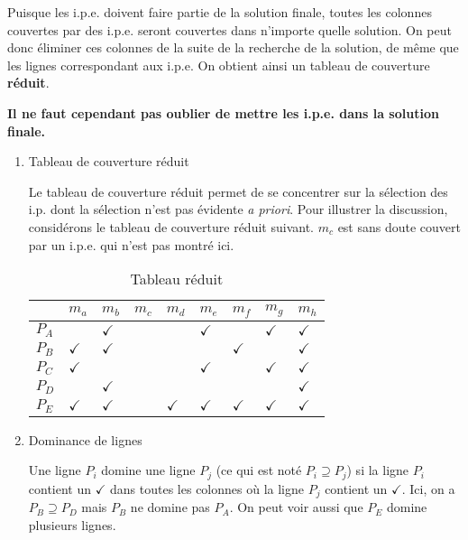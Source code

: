 \documentclass[letter, oneside]{book}
\begin{document}
Puisque les i.p.e. doivent faire partie de la solution finale, toutes
les colonnes couvertes par des i.p.e. seront couvertes dans n'importe
quelle solution. On peut donc éliminer ces colonnes de la suite de la
recherche de la solution, de même que les lignes correspondant aux
i.p.e. On obtient ainsi un tableau de couverture \textbf{réduit}.

\textbf{Il ne faut cependant pas oublier de mettre les i.p.e. dans la solution
finale.}

\begin{enumerate}
\item Tableau de couverture réduit
\label{sec:org0855a0f}

Le tableau de couverture réduit permet de se concentrer sur la
sélection des i.p. dont la sélection n'est pas évidente \emph{a
priori}. Pour illustrer la discussion, considérons le tableau de
couverture réduit suivant. \(m_c\) est sans doute couvert par un
i.p.e. qui n'est pas montré ici.

\begin{table}[htbp]
\caption{\label{tab:orgab6062e}Tableau réduit}
\centering
\begin{tabular}{lllllllll}
 & \(m_a\) & \(m_b\) & \(m_c\) & \(m_d\) & \(m_e\) & \(m_f\) & \(m_g\) & \(m_h\)\\[0pt]
\hline
\(P_A\) &  & \(\checkmark\) &  &  & \(\checkmark\) &  & \(\checkmark\) & \(\checkmark\)\\[0pt]
\(P_B\) & \(\checkmark\) & \(\checkmark\) &  &  &  & \(\checkmark\) &  & \(\checkmark\)\\[0pt]
\(P_C\) & \(\checkmark\) &  &  &  & \(\checkmark\) &  & \(\checkmark\) & \(\checkmark\)\\[0pt]
\(P_D\) &  & \(\checkmark\) &  &  &  &  &  & \(\checkmark\)\\[0pt]
\(P_E\) & \(\checkmark\) & \(\checkmark\) &  & \(\checkmark\) & \(\checkmark\) & \(\checkmark\) & \(\checkmark\) & \(\checkmark\)\\[0pt]
\end{tabular}
\end{table}


\item Dominance de lignes
\label{sec:org7ca6eb1}

Une ligne \(P_i\) domine une ligne \(P_j\) (ce qui est noté \(P_i \supseteq
P_j\)) si la ligne \(P_i\) contient un \(\checkmark\) dans toutes les colonnes où
la ligne \(P_j\) contient un \(\checkmark\). Ici, on a \(P_B \supseteq P_D\) mais
\(P_B\) ne domine pas \(P_A\). On peut voir aussi que \(P_E\) domine
plusieurs lignes.


\end{enumerate}
\end{document}
